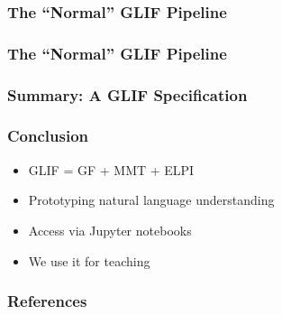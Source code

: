 \documentclass[aspectratio=169]{beamer}
\begin{document}
\begin{frame}
    \frametitle{The ``Normal'' GLIF Pipeline}
    
\end{frame}









\begin{frame}
    \frametitle{The ``Normal'' GLIF Pipeline}
    
\end{frame}



\begin{frame}
    \frametitle{Summary: A GLIF Specification}
    
\end{frame}


\begin{frame}
    \frametitle{Conclusion}
    \vspace{1em}
    \begin{itemize}
        \item GLIF = GF + MMT + ELPI
        \item Prototyping natural language understanding
        \item Access via Jupyter notebooks
        \item We use it for teaching
    \end{itemize}

    \vspace{2em}
    \centering
    \par
\end{frame}

\appendix



\begin{frame}[allowframebreaks,t]
    \frametitle{References}
    \printbibliography
\end{frame}
\end{document}
